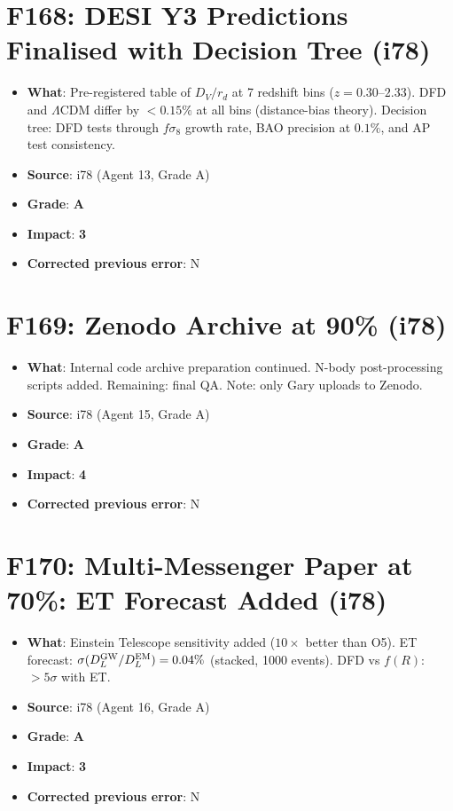 \documentclass[11pt,a4paper]{article}
\newcommand{\grade}[1]{\textbf{#1}}
\newcommand{\impact}[1]{\textbf{#1}}
\begin{document}
\section{F168: DESI Y3 Predictions Finalised with Decision Tree (i78)}
\begin{itemize}[nosep]
\item \textbf{What}: Pre-registered table of $D_V/r_d$ at 7 redshift bins ($z = 0.30$--$2.33$). DFD and $\Lambda$CDM differ by $< 0.15\%$ at all bins (distance-bias theory). Decision tree: DFD tests through $f\sigma_8$ growth rate, BAO precision at $0.1\%$, and AP test consistency.
\item \textbf{Source}: i78 (Agent 13, Grade A)
\item \textbf{Grade}: \grade{A}
\item \textbf{Impact}: \impact{3}
\item \textbf{Corrected previous error}: N
\end{itemize}

\section{F169: Zenodo Archive at 90\% (i78)}
\begin{itemize}[nosep]
\item \textbf{What}: Internal code archive preparation continued. N-body post-processing scripts added. Remaining: final QA. Note: only Gary uploads to Zenodo.
\item \textbf{Source}: i78 (Agent 15, Grade A)
\item \textbf{Grade}: \grade{A}
\item \textbf{Impact}: \impact{4}
\item \textbf{Corrected previous error}: N
\end{itemize}

\section{F170: Multi-Messenger Paper at 70\%: ET Forecast Added (i78)}
\begin{itemize}[nosep]
\item \textbf{What}: Einstein Telescope sensitivity added ($10\times$ better than O5). ET forecast: $\sigma(D_L^{\rm GW}/D_L^{\rm EM}) = 0.04\%$ (stacked, 1000 events). DFD vs $f(R)$: $> 5\sigma$ with ET.
\item \textbf{Source}: i78 (Agent 16, Grade A)
\item \textbf{Grade}: \grade{A}
\item \textbf{Impact}: \impact{3}
\item \textbf{Corrected previous error}: N
\end{itemize}
\end{document}
